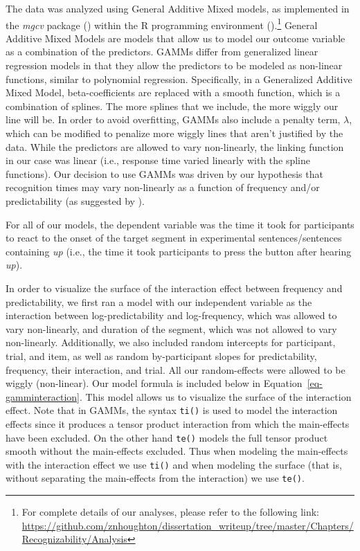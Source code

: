 \documentclass[
  12pt,
  letterpaper,
]{scrreprt}
\begin{document}
The data was analyzed using General Additive Mixed models, as
implemented in the \emph{mgcv} package
() within the R programming
environment ().\footnote{For
  complete details of our analyses, please refer to the following link:
  \url{https://github.com/znhoughton/dissertation_writeup/tree/master/Chapters/Recognizability/Analysis}}
General Additive Mixed Models are models that allow us to model our
outcome variable as a combination of the predictors. GAMMs differ from
generalized linear regression models in that they allow the predictors
to be modeled as non-linear functions, similar to polynomial regression.
Specifically, in a Generalized Additive Mixed Model, beta-coefficients
are replaced with a smooth function, which is a combination of splines.
The more splines that we include, the more wiggly our line will be. In
order to avoid overfitting, GAMMs also include a penalty term,
\(\lambda\), which can be modified to penalize more wiggly lines that
aren't justified by the data. While the predictors are allowed to vary
non-linearly, the linking function in our case was linear (i.e.,
response time varied linearly with the spline functions). Our decision
to use GAMMs was driven by our hypothesis that recognition times may
vary non-linearly as a function of frequency and/or predictability (as
suggested by
).

For all of our models, the dependent variable was the time it took for
participants to react to the onset of the target segment in experimental
sentences/sentences containing \emph{up} (i.e., the time it took
participants to press the button after hearing \emph{up}).

In order to visualize the surface of the interaction effect between
frequency and predictability, we first ran a model with our independent
variable as the interaction between log-predictability and
log-frequency, which was allowed to vary non-linearly, and duration of
the segment, which was not allowed to vary non-linearly. Additionally,
we also included random intercepts for participant, trial, and item, as
well as random by-participant slopes for predictability, frequency,
their interaction, and trial. All our random-effects were allowed to be
wiggly (non-linear). Our model formula is included below in
Equation~\ref{eq-gamminteraction}. This model allows us to visualize the
surface of the interaction effect. Note that in GAMMs, the syntax
\texttt{ti()} is used to model the interaction effects since it produces
a tensor product interaction from which the main-effects have been
excluded. On the other hand \texttt{te()} models the full tensor product
smooth without the main-effects excluded. Thus when modeling the
main-effects with the interaction effect we use \texttt{ti()} and when
modeling the surface (that is, without separating the main-effects from
the interaction) we use \texttt{te()}.
\end{document}
